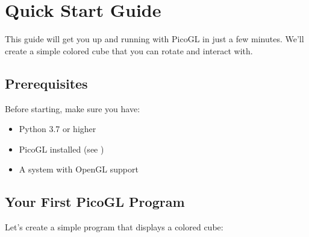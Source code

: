 \documentclass[a4paper,10pt,english,openany,oneside]{sphinxmanual}
\begin{document}
\sphinxstepscope


\section{Quick Start Guide}
\label{\detokenize{quickstart:quick-start-guide}}\label{\detokenize{quickstart::doc}}
\sphinxAtStartPar
This guide will get you up and running with PicoGL in just a few minutes. We’ll create a simple colored cube that you can rotate and interact with.


\subsection{Prerequisites}
\label{\detokenize{quickstart:prerequisites}}
\sphinxAtStartPar
Before starting, make sure you have:
\begin{itemize}
\item {} 
\sphinxAtStartPar
Python 3.7 or higher

\item {} 
\sphinxAtStartPar
PicoGL installed (see {\hyperref[\detokenize{installation::doc}]{}})

\item {} 
\sphinxAtStartPar
A system with OpenGL support

\end{itemize}


\subsection{Your First PicoGL Program}
\label{\detokenize{quickstart:your-first-picogl-program}}
\sphinxAtStartPar
Let’s create a simple program that displays a colored cube:
\end{document}
